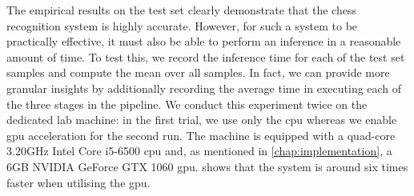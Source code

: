 \documentclass[../main.tex]{subfiles}
\begin{document}
The empirical results on the test set clearly demonstrate that the chess recognition system is highly accurate.
However, for such a system to be practically effective, it must also be able to perform an inference in a reasonable amount of time.
To test this, we record the inference time for each of the test set samples and compute the mean over all samples.
In fact, we can provide more granular insights by additionally recording the average time in executing each of the three stages in the pipeline.
We conduct this experiment twice on the dedicated lab machine: in the first trial, we use only the \gls{cpu} whereas we enable \gls{gpu} acceleration for the second run.
The machine is equipped with a quad-core 3.20GHz Intel Core i5-6500 \gls{cpu} and, as mentioned in \cref{chap:implementation}, a 6GB NVIDIA GeForce GTX 1060 \gls{gpu}.
 shows that the system is around six times faster when utilising the \gls{gpu}.
\end{document}
